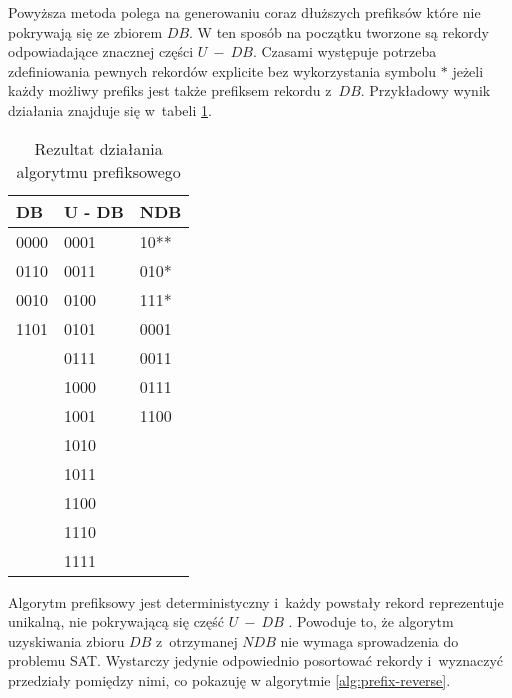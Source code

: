 Powyższa metoda polega na generowaniu coraz dłuższych prefiksów które nie pokrywają się ze zbiorem $DB$.
W ten sposób na początku tworzone są rekordy odpowiadające znacznej części $U~-~DB$. Czasami występuje potrzeba zdefiniowania pewnych rekordów explicite bez wykorzystania symbolu $*$ jeżeli każdy możliwy prefiks jest także prefiksem rekordu z~$DB$. 
Przykładowy wynik działania znajduje się w~tabeli \ref{tbl:prefix_results}.

\begin{table}[!h]
    \centering
    \begin{tabular}{|l|l|l|}
        \hline
        DB   & U - DB & NDB  \\ \hline
        0000 & 0001   & 10** \\
        0110 & 0011   & 010* \\
        0010 & 0100   & 111* \\
        1101 & 0101   & 0001 \\
        & 0111   & 0011 \\
        & 1000   & 0111 \\
        & 1001   & 1100 \\
        & 1010   &      \\
        & 1011   &      \\
        & 1100   &      \\
        & 1110   &      \\
        & 1111   &      \\ \hline
    \end{tabular}
    \caption{Rezultat działania algorytmu prefiksowego}
    \label{tbl:prefix_results}
\end{table}

Algorytm prefiksowy jest deterministyczny i~każdy powstały rekord reprezentuje unikalną, nie pokrywającą się część $U~-~DB$ \cite{NRI-Esponda}.
Powoduje to, że algorytm uzyskiwania zbioru $DB$ z~otrzymanej $NDB$ nie wymaga sprowadzenia do problemu SAT. Wystarczy jedynie odpowiednio posortować rekordy i~wyznaczyć przedziały pomiędzy nimi, co pokazuję w algorytmie \ref{alg:prefix-reverse}.

